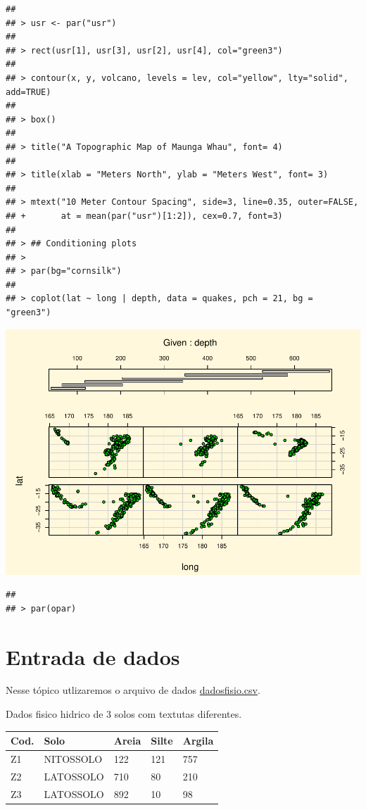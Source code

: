 \documentclass[]{book}
\begin{document}
\begin{verbatim}
## 
## > usr <- par("usr")
## 
## > rect(usr[1], usr[3], usr[2], usr[4], col="green3")
## 
## > contour(x, y, volcano, levels = lev, col="yellow", lty="solid", add=TRUE)
## 
## > box()
## 
## > title("A Topographic Map of Maunga Whau", font= 4)
## 
## > title(xlab = "Meters North", ylab = "Meters West", font= 3)
## 
## > mtext("10 Meter Contour Spacing", side=3, line=0.35, outer=FALSE,
## +       at = mean(par("usr")[1:2]), cex=0.7, font=3)
## 
## > ## Conditioning plots
## > 
## > par(bg="cornsilk")
## 
## > coplot(lat ~ long | depth, data = quakes, pch = 21, bg = "green3")
\end{verbatim}

\includegraphics{TudodoR_files/figure-latex/unnamed-chunk-147-11.pdf}

\begin{verbatim}
## 
## > par(opar)
\end{verbatim}

\hypertarget{entrada-de-dados-1}{%
\section{Entrada de dados}\label{entrada-de-dados-1}}

Nesse tópico utlizaremos o arquivo de dados \href{https://www.dropbox.com/s/zg7fyg1iewtji49/dadosfisio.csv?dl=1}{dadosfisio.csv}.

Dados fisico hidrico de 3 solos com textutas diferentes.

\begin{longtable}[]{@{}lllll@{}}
\toprule
Cod. & Solo & Areia & Silte & Argila\tabularnewline
\midrule
\endhead
Z1 & NITOSSOLO & 122 & 121 & 757\tabularnewline
Z2 & LATOSSOLO & 710 & 80 & 210\tabularnewline
Z3 & LATOSSOLO & 892 & 10 & 98\tabularnewline
\bottomrule
\end{longtable}
\end{document}
